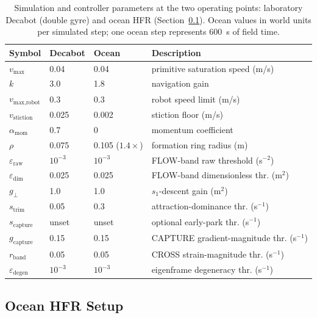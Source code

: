\documentclass[lettersize,journal]{IEEEtran}
\begin{document}
\begin{table}[!t]
\centering
\caption{Simulation and controller parameters at the two operating
points: laboratory Decabot (double gyre) and ocean HFR
(Section~\ref{sec:ocean_sim}). Ocean values in world units per
simulated step; one ocean step represents 600~s of field time.}
\label{tab:params}
\footnotesize
\setlength{\tabcolsep}{3pt}
\begin{tabular}{llll}
\hline
\textbf{Symbol} & \textbf{Decabot} & \textbf{Ocean} & \textbf{Description} \\
\hline
$v_{\max}$ & 0.04 & 0.04 & primitive saturation speed (m/s) \\
$k$ & 3.0 & 1.8 & navigation gain \\
$v_{\text{max,robot}}$ & 0.3 & 0.3 & robot speed limit (m/s) \\
$v_{\text{stiction}}$ & 0.025 & 0.002 & stiction floor (m/s) \\
$\alpha_{\text{mom}}$ & 0.7 & 0 & momentum coefficient \\
$\rho$ & 0.075 & 0.105 ($1.4\times$) & formation ring radius (m) \\
$\varepsilon_{\text{raw}}$ & $10^{-3}$ & $10^{-3}$ & FLOW-band raw threshold (s$^{-2}$) \\
$\varepsilon_{\text{dim}}$ & 0.025 & 0.025 & FLOW-band dimensionless thr. (m$^2$) \\
$g_\perp$ & 1.0 & 1.0 & $s_1$-descent gain (m$^2$) \\
$s_{\text{trim}}$ & 0.05 & 0.3 & attraction-dominance thr. (s$^{-1}$) \\
$s_{\text{capture}}$ & unset & unset & optional early-park thr. (s$^{-1}$) \\
$g_{\text{capture}}$ & 0.15 & 0.15 & CAPTURE gradient-magnitude thr. (s$^{-1}$) \\
$r_{\text{band}}$ & 0.05 & 0.05 & CROSS strain-magnitude thr. (s$^{-1}$) \\
$\varepsilon_{\text{degen}}$ & $10^{-3}$ & $10^{-3}$ & eigenframe degeneracy thr. (s$^{-1}$) \\
\hline
\end{tabular}
\end{table}

\subsection{Ocean HFR Setup}
\label{sec:ocean_sim}
\end{document}
